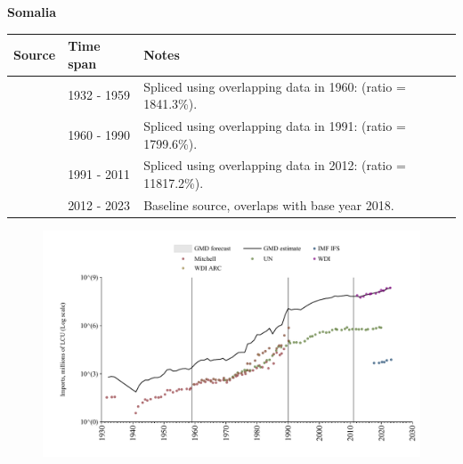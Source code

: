 \documentclass[12pt,a4paper,landscape]{article}
\begin{document}
\begin{adjustbox}{max totalsize={\paperwidth}{\paperheight},center}
\begin{minipage}[t][\textheight][t]{\textwidth}
\vspace*{0.5cm}
{}
\begin{center}
{\Large\bfseries Somalia}
\end{center}
\vspace{0.5cm}
\begin{table}[H]
\centering
\small
\begin{tabular}{|l|l|l|}
\hline
\textbf{Source} & \textbf{Time span} & \textbf{Notes} \\
\hline
\rowcolor{white}\cite{Mitchell}& 1932 - 1959 &Spliced using overlapping data in 1960: (ratio = 1841.3\%).\\
\rowcolor{lightgray}\cite{WDI}& 1960 - 1990 &Spliced using overlapping data in 1991: (ratio = 1799.6\%).\\
\rowcolor{white}\cite{UN}& 1991 - 2011 &Spliced using overlapping data in 2012: (ratio = 11817.2\%).\\
\rowcolor{lightgray}\cite{WDI}& 2012 - 2023 &Baseline source, overlaps with base year 2018.\\
\hline
\end{tabular}
\end{table}
\begin{figure}[H]
\centering
\includegraphics[width=\textwidth,height=0.6\textheight,keepaspectratio]{graphs/SOM_imports.pdf}
\end{figure}
\end{minipage}
\end{adjustbox}
\end{document}
